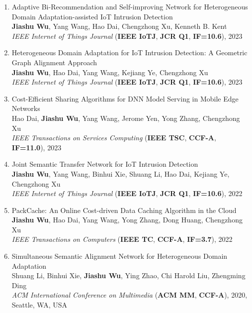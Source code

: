 \documentclass[letterpaper,11pt]{article}
\begin{document}
\begin{enumerate}
  \item Adaptive Bi-Recommendation and Self-improving Network for Heterogeneous Domain Adaptation-assisted IoT Intrusion Detection\\
  \textbf{Jiashu Wu}, Yang Wang\textsuperscript{\Letter}, Hao Dai, Chengzhong Xu, Kenneth B. Kent\\
  \textit{IEEE Internet of Things Journal} (\textbf{IEEE IoTJ}, \textbf{JCR Q1}, \textbf{IF=10.6}), 2023

  \item Heterogeneous Domain Adaptation for IoT Intrusion Detection: A Geometric Graph Alignment Approach\\
  \textbf{Jiashu Wu}, Hao Dai, Yang Wang\textsuperscript{\Letter}, Kejiang Ye, Chengzhong Xu\\
  \textit{IEEE Internet of Things Journal} (\textbf{IEEE IoTJ}, \textbf{JCR Q1}, \textbf{IF=10.6}), 2023

  \item Cost-Efficient Sharing Algorithms for DNN Model Serving in Mobile Edge Networks\\
  Hao Dai, \textbf{Jiashu Wu}, Yang Wang\textsuperscript{\Letter}, Jerome Yen, Yong Zhang, Chengzhong Xu\\
  \textit{IEEE Transactions on Services Computing} (\textbf{IEEE TSC}, \textbf{CCF-A}, \textbf{IF=11.0}), 2023

  \item Joint Semantic Transfer Network for IoT Intrusion Detection\\
  \textbf{Jiashu Wu}, Yang Wang\textsuperscript{\Letter}, Binhui Xie, Shuang Li, Hao Dai, Kejiang Ye, Chengzhong Xu\\
  \textit{IEEE Internet of Things Journal} (\textbf{IEEE IoTJ}, \textbf{JCR Q1}, \textbf{IF=10.6}), 2022

  \item PackCache: An Online Cost-driven Data Caching Algorithm in the Cloud\\
  \textbf{Jiashu Wu}, Hao Dai, Yang Wang\textsuperscript{\Letter}, Yong Zhang, Dong Huang, Chengzhong Xu\\
  \textit{IEEE Transactions on Computers} (\textbf{IEEE TC}, \textbf{CCF-A}, \textbf{IF=3.7}), 2022

  \item Simultaneous Semantic Alignment Network for Heterogeneous Domain Adaptation\\
  Shuang Li, Binhui Xie, \textbf{Jiashu Wu}, Ying Zhao, Chi Harold Liu\textsuperscript{\Letter}, Zhengming Ding\\
  \textit{ACM International Conference on Multimedia} (\textbf{ACM MM}, \textbf{CCF-A}), 2020, Seattle, WA, USA


\end{enumerate}
\end{document}
